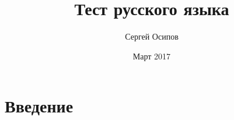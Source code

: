 \documentclass{article}
\title{Тест русского языка}
\author{Сергей Осипов}
\date{Март 2017}
\begin{document}
\maketitle

\section{Введение}
\end{document}

